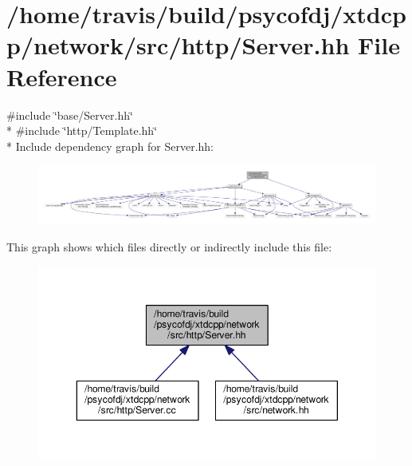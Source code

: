 \hypertarget{http_2Server_8hh}{\section{/home/travis/build/psycofdj/xtdcpp/network/src/http/\-Server.hh File Reference}
\label{http_2Server_8hh}
}
{\ttfamily \#include \char`\"{}base/\-Server.\-hh\char`\"{}}\\*
{\ttfamily \#include \char`\"{}http/\-Template.\-hh\char`\"{}}\\*
Include dependency graph for Server.\-hh\-:
\nopagebreak
\begin{figure}[H]
\begin{center}
\leavevmode
\includegraphics[width=350pt]{http_2Server_8hh__incl}
\end{center}
\end{figure}
This graph shows which files directly or indirectly include this file\-:
\nopagebreak
\begin{figure}[H]
\begin{center}
\leavevmode
\includegraphics[width=350pt]{http_2Server_8hh__dep__incl}
\end{center}
\end{figure}
